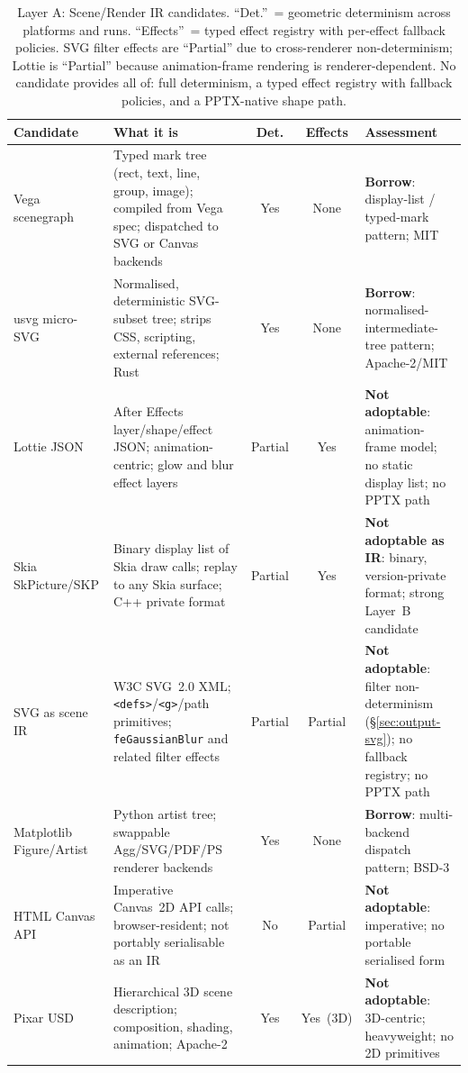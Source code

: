\begin{table}[h]
\centering
\small
\begin{tabularx}{\textwidth}{l X c c X}
\toprule
\textbf{Candidate} & \textbf{What it is} &
  \textbf{Det.} & \textbf{Effects} & \textbf{Assessment} \\
\midrule
Vega scenegraph~\cite{vega-scenegraph} &
  Typed mark tree (rect, text, line, group, image); compiled from Vega
  spec; dispatched to SVG or Canvas backends &
  Yes & None &
  \textbf{Borrow}: display-list / typed-mark pattern; MIT \\[3pt]
usvg micro-SVG~\cite{usvg} &
  Normalised, deterministic SVG-subset tree; strips CSS, scripting,
  external references; Rust &
  Yes & None &
  \textbf{Borrow}: normalised-intermediate-tree pattern;
  Apache-2/MIT \\[3pt]
Lottie JSON~\cite{lottie} &
  After Effects layer/shape/effect JSON; animation-centric; glow and
  blur effect layers &
  Partial & Yes &
  \textbf{Not adoptable}: animation-frame model; no static
  display list; no PPTX path \\[3pt]
Skia SkPicture/SKP &
  Binary display list of Skia draw calls; replay to any Skia surface;
  C++ private format &
  Partial & Yes &
  \textbf{Not adoptable as IR}: binary, version-private format;
  strong Layer~B candidate \\[3pt]
SVG as scene IR &
  W3C SVG~2.0 XML; \texttt{<defs>}/\texttt{<g>}/path primitives;
  \texttt{feGaussianBlur} and related filter effects &
  Partial & Partial &
  \textbf{Not adoptable}: filter non-determinism
  (\S\ref{sec:output-svg}); no fallback registry; no PPTX path \\[3pt]
Matplotlib Figure/Artist~\cite{matplotlib} &
  Python artist tree; swappable Agg/SVG/PDF/PS renderer backends &
  Yes & None &
  \textbf{Borrow}: multi-backend dispatch pattern; BSD-3 \\[3pt]
HTML Canvas API~\cite{webgl} &
  Imperative Canvas~2D API calls; browser-resident; not portably
  serialisable as an IR &
  No & Partial &
  \textbf{Not adoptable}: imperative; no portable serialised form \\[3pt]
Pixar USD &
  Hierarchical 3D scene description; composition, shading, animation;
  Apache-2 &
  Yes & Yes~(3D) &
  \textbf{Not adoptable}: 3D-centric; heavyweight; no 2D primitives \\
\bottomrule
\end{tabularx}
\caption{Layer A: Scene/Render IR candidates. ``Det.''~= geometric determinism
  across platforms and runs. ``Effects''~= typed effect registry with per-effect
  fallback policies. SVG filter effects are ``Partial'' due to cross-renderer
  non-determinism; Lottie is ``Partial'' because animation-frame rendering is
  renderer-dependent. No candidate provides all of: full determinism, a typed
  effect registry with fallback policies, and a PPTX-native shape path.}
\label{tab:scene-ir-candidates}
\end{table}

